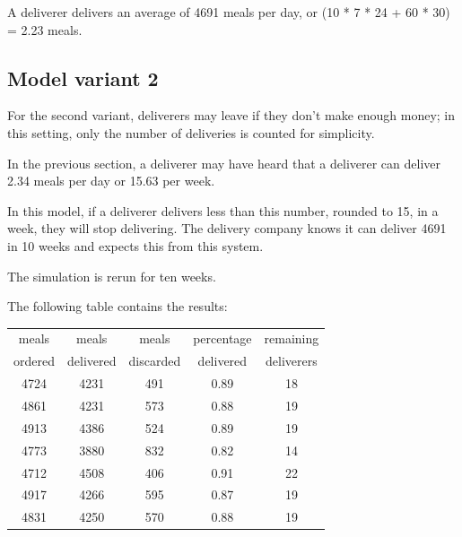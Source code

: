 A deliverer delivers an average of 4691 meals per day, or (10 * 7 * 24 + 60 * 30) = 2.23 meals.

\subsection{Model variant 2}\label{subsec:model-variant-2}
For the second variant, deliverers may leave if they don't make enough money; in this setting, only the number of deliveries is counted for simplicity.

In the previous section, a deliverer may have heard that a deliverer can deliver 2.34 meals per day or 15.63 per week.

In this model, if a deliverer delivers less than this number, rounded to 15, in a week, they will stop delivering.
The delivery company knows it can deliver 4691 in 10 weeks and expects this from this system.

The simulation is rerun for ten weeks.

The following table contains the results:
\begin{center}
    \begin{tabular}{ |c|c|c|c|c| }
        \hline
        meals & meals & meals & percentage & remaining \\
        ordered & delivered & discarded & delivered & deliverers \\
        \hline
        \hline
        4724          & 4231           & 491             & 0.89  & 18               \\
        \hline
        4861          & 4231           & 573             & 0.88  & 19               \\
        \hline
        4913          & 4386           & 524             & 0.89  & 19               \\
        \hline
        4773          & 3880           & 832             & 0.82  & 14               \\
        \hline
        4712          & 4508           & 406             & 0.91  & 22               \\
        \hline
        4917          & 4266           & 595             & 0.87  & 19               \\
        \hline
        \hline
        4831          & 4250           & 570             & 0.88  & 19               \\
        \hline
    \end{tabular}
\end{center}


